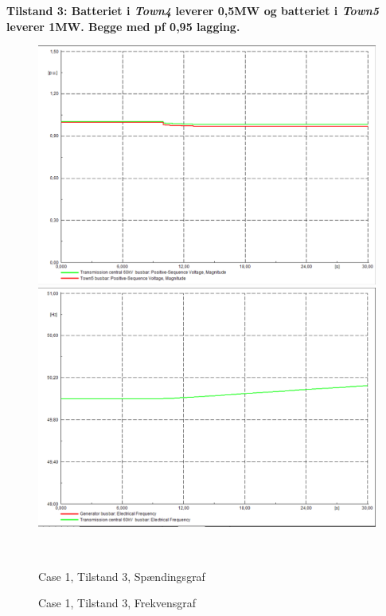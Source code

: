 \textbf{Tilstand 3: Batteriet i \textit{Town4} leverer 0,5MW og batteriet i \textit{Town5} leverer 1MW. Begge med pf 0,95 lagging.}
\begin{figure}[H]
	\centering
	\begin{minipage}[b]{0.48\textwidth}
		\centering
		\includegraphics[width=1.00\textwidth]{figurer/SmallDisturbance/Voltage3} %
	\end{minipage}
	\hfill
	\begin{minipage}[b]{0.48\textwidth}
		\centering
		\includegraphics[width=1.00\textwidth]{figurer/SmallDisturbance/Freq3} %
	\end{minipage}
	\\ %
	\begin{minipage}[t]{0.48\textwidth}
		\caption{Case 1, Tilstand 3, Spændingsgraf} %
		\label{fig:C1T3V}
	\end{minipage}
	\hfill
	\begin{minipage}[t]{0.48\textwidth}
		\caption{Case 1, Tilstand 3, Frekvensgraf} %
		\label{fig:C1T3F}
	\end{minipage}
\end{figure}

